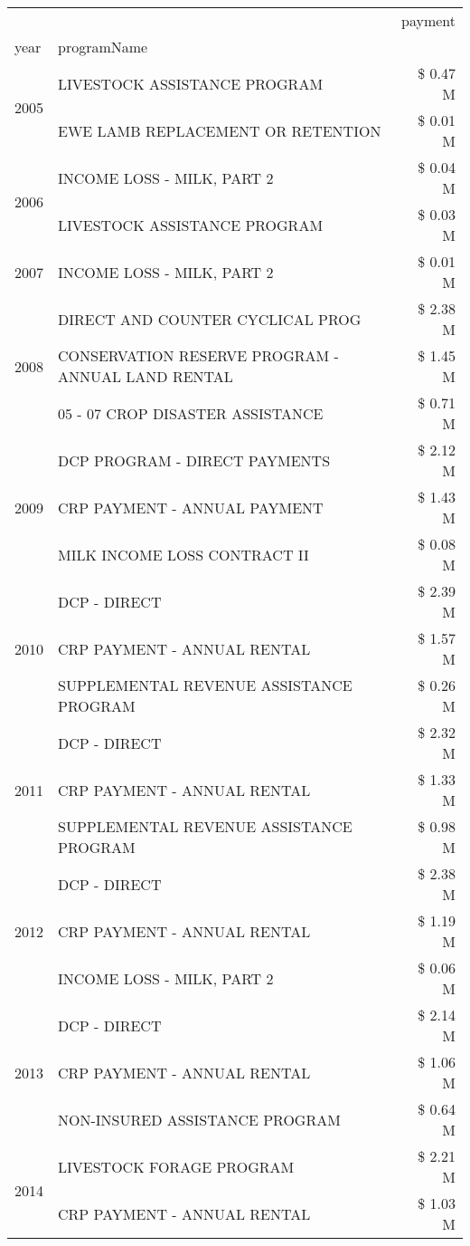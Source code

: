 \begin{tabular}{llr}
\toprule
 &  & payment \\
year & programName &  \\
\midrule
\multirow[t]{2}{*}{2005} & LIVESTOCK ASSISTANCE PROGRAM & \$ 0.47 M \\
 & EWE LAMB REPLACEMENT OR RETENTION & \$ 0.01 M \\
\cline{1-3}
\multirow[t]{2}{*}{2006} & INCOME LOSS - MILK, PART 2 & \$ 0.04 M \\
 & LIVESTOCK ASSISTANCE PROGRAM & \$ 0.03 M \\
\cline{1-3}
2007 & INCOME LOSS - MILK, PART 2 & \$ 0.01 M \\
\cline{1-3}
\multirow[t]{3}{*}{2008} & DIRECT AND COUNTER CYCLICAL PROG & \$ 2.38 M \\
 & CONSERVATION RESERVE PROGRAM - ANNUAL LAND RENTAL & \$ 1.45 M \\
 & 05 - 07 CROP DISASTER ASSISTANCE & \$ 0.71 M \\
\cline{1-3}
\multirow[t]{3}{*}{2009} & DCP PROGRAM - DIRECT PAYMENTS & \$ 2.12 M \\
 & CRP PAYMENT - ANNUAL PAYMENT & \$ 1.43 M \\
 & MILK INCOME LOSS CONTRACT II & \$ 0.08 M \\
\cline{1-3}
\multirow[t]{3}{*}{2010} & DCP - DIRECT & \$ 2.39 M \\
 & CRP PAYMENT - ANNUAL RENTAL & \$ 1.57 M \\
 & SUPPLEMENTAL REVENUE ASSISTANCE PROGRAM & \$ 0.26 M \\
\cline{1-3}
\multirow[t]{3}{*}{2011} & DCP - DIRECT & \$ 2.32 M \\
 & CRP PAYMENT - ANNUAL RENTAL & \$ 1.33 M \\
 & SUPPLEMENTAL REVENUE ASSISTANCE PROGRAM & \$ 0.98 M \\
\cline{1-3}
\multirow[t]{3}{*}{2012} & DCP - DIRECT & \$ 2.38 M \\
 & CRP PAYMENT - ANNUAL RENTAL & \$ 1.19 M \\
 & INCOME LOSS - MILK, PART 2 & \$ 0.06 M \\
\cline{1-3}
\multirow[t]{3}{*}{2013} & DCP - DIRECT & \$ 2.14 M \\
 & CRP PAYMENT - ANNUAL RENTAL & \$ 1.06 M \\
 & NON-INSURED ASSISTANCE PROGRAM & \$ 0.64 M \\
\cline{1-3}
\multirow[t]{3}{*}{2014} & LIVESTOCK FORAGE PROGRAM & \$ 2.21 M \\
 & CRP PAYMENT - ANNUAL RENTAL & \$ 1.03 M \\

\end{tabular}
